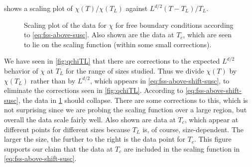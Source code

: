  shows a scaling plot of $\chi(T)/\chi(T_L)$ against
$L^{d/2}(T-T_L)/T_L$.
\begin{figure}
  \centering
  
  \caption[
    Scaling plot of the susceptibility $\chi$ for the five-dimensional Ising
    model with free boundary conditions.
  ]
  {
    Scaling plot of the data for $\chi$ for free boundary conditions according
    to \cref{eq:fss-above-susc}. Also shown are the data at $T_c$, which
    are seen to lie on the scaling function (within some small corrections).
  }
  \label{fig:chi-f-scaling}
\end{figure}
We have seen in \cref{fig:qchiTL} that there are corrections to the expected
$L^{d/2}$ behavior of $\chi$ at $T_L$ for the range of sizes studied. Thus we
divide $\chi(T)$ by $\chi(T_L)$ rather than by $L^{d/2}$, which appears in
\cref{eq:fss-above-shift-susc}, to eliminate the corrections seen in
\cref{fig:qchiTL}. According to \cref{eq:fss-above-shift-susc}, the data in
\cref{fig:chi-f-scaling} should collapse. There are some corrections to this,
which is not surprising since we are probing the scaling function over a large
region, but overall the data scale fairly well. Also shown are data at $T_c$,
which appear at different points for different sizes because $T_L$ is, of
course, size-dependent. The larger the size, the further to the right is the
data point for $T_c$. This figure supports our claim that the data at $T_c$ are
included in the scaling function in \cref{eq:fss-above-shift-susc}.

